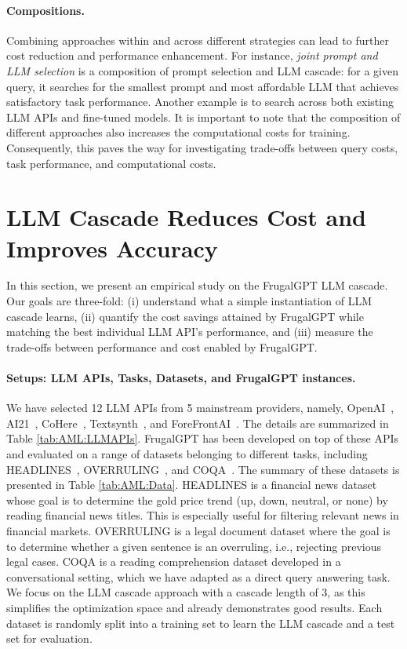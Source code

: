 \documentclass{article}
\numberwithin{equation}{section}
\newcommand{\systemFGPT}{{FrugalGPT}}
\begin{document}
\paragraph{Compositions.} Combining approaches within and across different strategies can lead to further cost reduction and performance enhancement. For instance, \textit{joint prompt and LLM selection} is a composition of prompt selection and LLM cascade: for a given query, it searches for the smallest prompt and most affordable LLM that achieves satisfactory task performance. Another example is to search across both existing LLM APIs and fine-tuned models. It is important to note that the composition of different approaches also increases the computational costs for training. Consequently, this paves the way for investigating trade-offs between query costs, task performance, and computational costs.


\section{LLM Cascade Reduces Cost and Improves Accuracy}\label{sec:AML:Experiment}
In this section, we present an empirical study on the \systemFGPT{} LLM cascade. Our goals are three-fold: (i) understand what a simple instantiation of LLM cascade learns, (ii) quantify the cost savings attained by \systemFGPT{} while matching the best individual LLM API's performance, and (iii) measure the trade-offs between performance and cost enabled by \systemFGPT{}.

\paragraph{Setups: LLM APIs, Tasks, Datasets, and \systemFGPT{} instances.}
We have selected 12 LLM APIs from 5 mainstream providers, namely, OpenAI~\cite{OpenAIAPI}, AI21~\cite{AI21API}, CoHere~\cite{CoHereAPI}, Textsynth~\cite{TextsynthAPI}, and ForeFrontAI~\cite{FFAIAPI}. The details are summarized in Table \ref{tab:AML:LLMAPIs}. \systemFGPT{} has been developed on top of these APIs and evaluated on a range of datasets belonging to different tasks, including HEADLINES~\cite{sinha2021impact}, OVERRULING~\cite{zheng2021does}, and COQA~\cite{reddy2019coqa}. The summary of these datasets is presented in Table \ref{tab:AML:Data}.
HEADLINES is a financial news dataset whose goal is to determine the gold price trend (up, down, neutral, or none) by reading financial news titles. This is especially useful for filtering relevant news in financial markets. OVERRULING is a legal document dataset where the goal is to determine whether a given sentence is an overruling, i.e., rejecting previous legal cases. COQA is a reading comprehension dataset developed in a conversational setting, which we have adapted as a direct query answering task.
We focus on the LLM cascade approach with a cascade length of 3, as this simplifies the optimization space and already demonstrates good results. Each dataset is randomly split into a training set to learn the LLM cascade and a test set for evaluation. 
\end{document}
